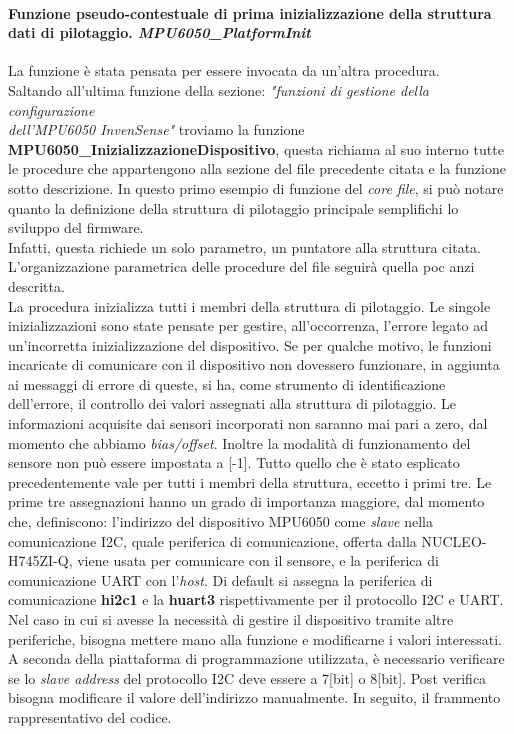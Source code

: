 \documentclass[11pt]{report}
\begin{document}
\paragraph{Funzione pseudo-contestuale di prima inizializzazione della struttura dati di pilotaggio. \textit{MPU6050\_PlatformInit}}
La funzione è stata pensata per essere invocata da un'altra procedura.\\
Saltando all'ultima funzione della sezione: \textit{"funzioni di gestione della configurazione\\dell'MPU6050 InvenSense"} troviamo la funzione
\textbf{MPU6050\_InizializzazioneDispositivo}, questa richiama al suo interno tutte le procedure che appartengono alla sezione del file precedente citata e la funzione sotto descrizione.
In questo primo esempio di funzione del \textit{core file}, si può notare quanto la definizione della struttura di pilotaggio principale semplifichi lo sviluppo del firmware.\\
Infatti, questa richiede un solo parametro, un puntatore alla struttura citata.\\ 
L'organizzazione parametrica delle procedure del file seguirà quella poc anzi descritta.\\
La procedura inizializza tutti i membri della struttura di pilotaggio. Le singole inizializzazioni sono state pensate per gestire, all'occorrenza, l'errore legato ad un'incorretta inizializzazione del dispositivo. 
Se per qualche motivo, le funzioni incaricate di comunicare con il dispositivo non dovessero funzionare, in aggiunta ai messaggi di errore di queste, si ha, come strumento di identificazione dell'errore, il controllo dei valori 
assegnati alla struttura di pilotaggio. Le informazioni acquisite dai sensori incorporati non saranno mai pari a zero, dal momento che abbiamo \textit{bias/offset}. Inoltre la modalità di funzionamento del sensore non può essere impostata a [-1].
Tutto quello che è stato esplicato precedentemente vale per tutti i membri della struttura, eccetto i primi tre. Le prime tre assegnazioni hanno un grado di importanza maggiore, dal momento che, definiscono: l'indirizzo del dispositivo MPU6050 come \textit{slave} nella comunicazione I2C, quale periferica di comunicazione, offerta dalla NUCLEO-H745ZI-Q, viene usata per comunicare con il sensore, e la periferica di comunicazione UART con l'\textit{host}.
Di default si assegna la periferica di comunicazione \textbf{hi2c1} e la \textbf{huart3} rispettivamente per il protocollo I2C e UART. Nel caso in cui si avesse la necessità di gestire il dispositivo tramite altre periferiche, bisogna mettere mano alla funzione e modificarne i valori interessati.
A seconda della piattaforma di programmazione utilizzata, è necessario verificare se lo \textit{slave address} del protocollo I2C deve essere a 7[bit] o 8[bit]. Post verifica bisogna modificare il valore dell'indirizzo manualmente. 
In seguito, il frammento rappresentativo del codice.

\end{document}
